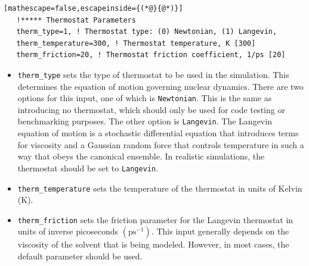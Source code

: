 \documentclass[letterpaper,12pt,titlepage]{article}
\begin{document}
\begin{lstlisting}[mathescape=false,escapeinside={(*@}{@*)}]
   !***** Thermostat Parameters
   therm_type=1, ! Thermostat type: (0) Newtonian, (1) Langevin, 
   therm_temperature=300, ! Thermostat temperature, K [300]
   therm_friction=20, ! Thermostat friction coefficient, 1/ps [20]
\end{lstlisting}
\begin{itemize}
\item \verb+therm_type+ sets the type of thermostat to be used in the simulation.  This determines the equation of motion governing nuclear dynamics.  There are two options for this input, one of which is \verb+Newtonian+.  This is the same as introducing no thermostat, which should only be used for code testing or benchmarking purposes.  The other option is \verb+Langevin+.  The Langevin equation of motion is a stochastic differential equation that introduces terms for viscosity and a Gaussian random force that controls temperature in such a way that obeys the canonical ensemble.  In realistic simulations, the thermostat should be set to \verb+Langevin+.
\item \verb+therm_temperature+ sets the temperature of the thermostat in units of Kelvin (K).
\item \verb+therm_friction+ sets the friction parameter for the Langevin thermostat in units of inverse picoseconds $\left(\text{ps}^{-1}\right)$.  This input generally depends on the viscosity of the solvent that is being modeled. However, in most cases, the default parameter should be used.
\end{itemize}
\end{document}
